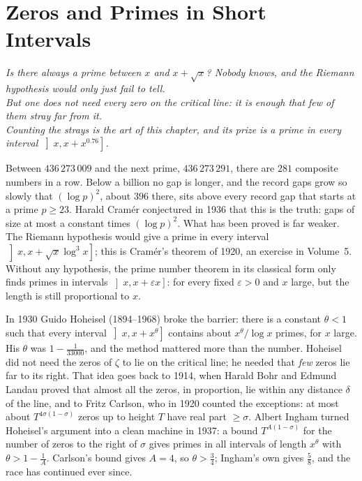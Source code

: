 \chapter{Zeros and Primes in Short Intervals}
\begin{center}\itshape
Is there always a prime between $x$ and $x+\sqrt x$? Nobody knows, and the Riemann hypothesis would only just fail to tell.\\
But one does not need every zero on the critical line: it is enough that few of them stray far from it.\\
Counting the strays is the art of this chapter, and its prize is a prime in every interval $\left]x,x+x^{0.76}\right]$.
\end{center}

Between $436\,273\,009$ and the next prime, $436\,273\,291$, there are $281$ composite numbers in a row. Below a billion no gap is longer, and the record gaps grow so slowly that $(\log p)^2$, about $396$ there, sits above every record gap that starts at a prime $p\ge23$. Harald Cram\'er
conjectured in 1936 that this is the truth: gaps of size at most a constant times $(\log p)^2$. What has been proved is far weaker. The Riemann hypothesis would give a prime in every interval $\left]x,x+\sqrt x\log^3x\right]$; this is Cram\'er's theorem of 1920, an exercise in Volume~5. Without
any hypothesis, the prime number theorem in its classical form only finds primes in intervals $\left]x,x+\varepsilon x\right]$: for every fixed $\varepsilon>0$ and $x$ large, but the length is still proportional to $x$.

In 1930 Guido Hoheisel (1894--1968) broke the barrier: there is a constant $\theta<1$ such that every interval $\left]x,x+x^\theta\right]$ contains about $x^\theta/\log x$ primes, for $x$ large. His $\theta$ was $1-\frac1{33000}$, and the method mattered more
than the number. Hoheisel did not need the zeros of $\zeta$ to lie on the critical line; he needed that \emph{few} zeros lie far to its right. That idea goes back to 1914, when Harald Bohr and Edmund Landau proved that almost all the zeros, in proportion, lie within any distance $\delta$
of the line, and to Fritz Carlson, who in 1920 counted the exceptions: at most about $T^{4\sigma(1-\sigma)}$ zeros up to height $T$ have real part $\ge\sigma$. Albert Ingham turned Hoheisel's argument into a clean machine in 1937: a bound $T^{A(1-\sigma)}$ for the number of zeros to the right of $\sigma$ gives primes in all intervals of length $x^\theta$ with $\theta>1-\frac1A$.
Carlson's bound gives $A=4$, so $\theta>\frac34$; Ingham's own gives $\frac58$, and the race has continued ever since.

